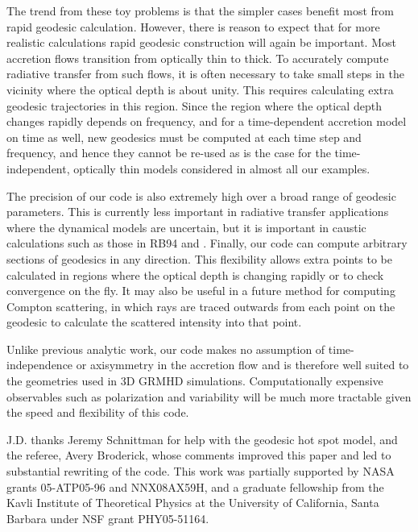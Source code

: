 \documentclass[apj]{emulateapj}
\begin{document}
The trend from these toy problems is that the simpler cases benefit most from rapid geodesic calculation. However, there is reason to expect that for more realistic calculations rapid geodesic construction will again be important. Most accretion flows transition from optically thin to thick. To accurately compute radiative transfer from such flows, it is often necessary to take small steps in the vicinity where the optical depth is about unity. This requires calculating extra geodesic trajectories in this region. Since the region where the optical depth changes rapidly depends on frequency, and for a time-dependent accretion model on time as well, new geodesics must be computed at each time step and frequency, and hence they cannot be re-used as is the case for the time-independent, optically thin models considered in almost all our examples.

The precision of our code is also extremely high over a broad range of geodesic parameters. This is currently less important in radiative transfer applications where the dynamical models are uncertain, but it is important in caustic calculations such as those in RB94 and \citet{bozza2008}. Finally, our code can compute arbitrary sections of geodesics in any direction. This flexibility allows extra points to be calculated in regions where the optical depth is changing rapidly or to check convergence on the fly. It may also be useful in a future method for computing Compton scattering, in which rays are traced outwards from each point on the geodesic to calculate the scattered intensity into that point.

Unlike previous analytic work, our code makes no assumption of time-independence or axisymmetry in the accretion flow and is therefore well suited to the geometries used in 3D GRMHD simulations. Computationally expensive observables such as polarization and variability will be much more tractable given the speed and flexibility of this code.

\begin{acknowledgements}
J.D. thanks Jeremy Schnittman for help with the geodesic hot spot model, and the referee, Avery Broderick, whose comments improved this paper and led to substantial rewriting of the code. This work was partially supported by NASA grants 05-ATP05-96 and NNX08AX59H, and a graduate fellowship from the Kavli Institute of Theoretical Physics at the University of California, Santa Barbara under NSF grant PHY05-51164.
\end{acknowledgements}
\end{document}

